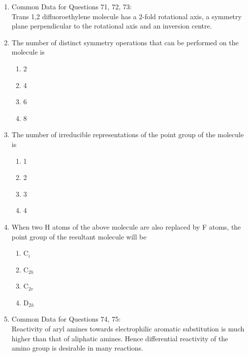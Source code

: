 \documentclass[journal,12pt,onecolumn]{IEEEtran}
\theoremstyle{remark}
\begin{document}
\begin{enumerate}
\item{Common Data for Questions 71, 72, 73:} \\
Trans 1,2 difluoroethylene molecule has a 2-fold rotational axis, a symmetry plane perpendicular to the rotational axis and an inversion centre.

\item  The number of distinct symmetry operations that can be performed on the molecule is \hfill{}

\begin{multicols}{2}
\begin{enumerate}[label=(\Alph*)]
\item 2
\item 4
\item 6
\item 8
\end{enumerate}
\end{multicols}
  

\item  The number of irreducible representations of the point group of the molecule is \hfill{}

\begin{multicols}{2}
\begin{enumerate}[label=(\Alph*)]
\item 1
\item 2
\item 3
\item 4
\end{enumerate}
\end{multicols}
  

\item  When two H atoms of the above molecule are also replaced by F atoms, the point group of the resultant molecule will be \hfill{}

\begin{multicols}{2}
\begin{enumerate}[label=(\Alph*)]
\item C$_i$
\item C$_{2h}$
\item C$_{2v}$
\item D$_{2h}$
\end{enumerate}
\end{multicols}
 

\item{Common Data for Questions 74, 75:} \\
Reactivity of aryl amines towards electrophilic aromatic substitution is much higher than that of aliphatic amines. Hence differential reactivity of the amino group is desirable in many reactions.
  

\end{enumerate}
\end{document}
